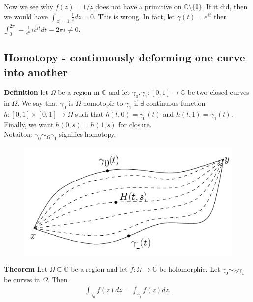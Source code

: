 \documentclass[a4paper, 11pt]{article}
\begin{document}
	\noindent Now we see why $f(z)=1/z$ does not have a primitive on $\mathbb{C}\setminus\{0\}$. If it did, then we would have $\int_{|z|=1}\frac{1}{z}dz = 0$. This is wrong. In fact, let $\gamma(t) = e^{it}$ then $\int_0^{2\pi} = \frac{1}{e^{it}}ie^{it}dt=2\pi i \neq 0$. 


\subsection*{Homotopy - continuously deforming one curve into another}
	\textbf{Definition} let $\Omega$ be a region in $\mathbb{C}$ and let $\gamma_0, \gamma_1:[0,1]\rightarrow\mathbb{C}$ be two closed curves in $\Omega$. We say that $\gamma_0$ is $\Omega$-homotopic to $\gamma_1$ if $\exists$ continuous function $h:[0,1]\times[0,1]\rightarrow\Omega$ such that $h(t,0)=\gamma_0(t)$ and $h(t,1)=\gamma_1(t)$. Finally, we want $h(0,s)=h(1,s)$ for closure. \\
	
	\noindent Notaiton: $\gamma_0 \sim_\Omega \gamma_1$ signifies homotopy. 
	\begin{figure}[!hbt]
		\centering
		\includegraphics[width=0.35\columnwidth]{homotopy}
	\end{figure}
	
	\noindent\textbf{Theorem} Let $\Omega\subseteq\mathbb{C}$ be a region and let $f:\Omega\rightarrow\mathbb{C}$ be holomorphic. Let $\gamma_0 \sim_\Omega \gamma_1$ be curves in $\Omega$. Then 
		\begin{align*}
			\int_{\gamma_0} f(z)dz = \int_{\gamma_1} f(z)dz. 
		\end{align*}
 
 
 
 
 

	
\end{document}

